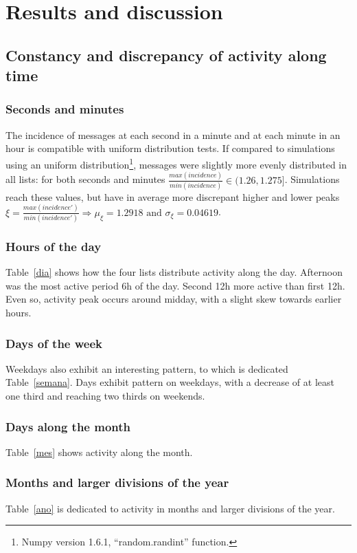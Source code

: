 \documentclass[%
 aip,
 jmp,%
 amsmath,amssymb,
 reprint,%
]{revtex4-1}
\begin{document}
\section{Results and discussion}
    \subsection{Constancy and discrepancy of activity along time}\label{constDisc}
        \subsubsection{Seconds and minutes}
The incidence of messages at each second in a minute and at each minute in an hour is compatible with uniform distribution tests.
If compared to simulations using an uniform distribution\footnote{Numpy version 1.6.1, ``random.randint'' function.}, messages were slightly more evenly distributed in all lists: for both seconds and minutes  $\frac{max(incidence)}{min(incidence)} \in (1.26,1.275]$. Simulations reach these values, but have in average more discrepant higher and lower peaks $\xi=\frac{max(incidence')}{min(incidence')} \Rightarrow \mu_\xi=1.2918 \text{ and } \sigma_\xi=0.04619$.

        \subsubsection{Hours of the day}
Table~\ref{dia} shows how the four lists distribute activity along the day.
Afternoon was the most active period 6h of the day. Second 12h more active than first 12h. Even so, activity peak occurs around midday, with a slight skew towards earlier hours.


        \subsubsection{Days of the week}
 Weekdays also exhibit an interesting pattern, to which is dedicated Table~\ref{semana}.
Days exhibit pattern on weekdays, with a decrease of at least one third and reaching two thirds on weekends.
        \subsubsection{Days along the month}
 Table~\ref{mes} shows activity along the month.

        \subsubsection{Months and larger divisions of the year}
Table~\ref{ano} is dedicated to activity in months and larger divisions of the year.
\end{document}
